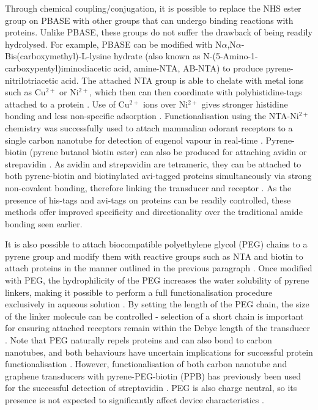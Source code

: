 \documentclass[
  a4paper,
]{scrbook}
\begin{document}
Through chemical coupling/conjugation, it is possible to replace the NHS
ester group on PBASE with other groups that can undergo binding
reactions with proteins. Unlike PBASE, these groups do not suffer the
drawback of being readily hydrolysed. For example, PBASE can be modified
with N\(\alpha\),N\(\alpha\)-Bis(carboxymethyl)-L-lysine hydrate (also
known as N-(5-Amino-1-carboxypentyl)iminodiacetic acid, amine-NTA,
AB-NTA) to produce pyrene-nitrilotriacetic acid. The attached NTA group
is able to chelate with metal ions such as Cu\(^{2+}\) or Ni\(^{2+}\),
which then can then coordinate with polyhistidine-tags attached to a
protein \autocite{Holzinger2011,Fruh2011,Amano2016,Chang2017}. Use of
Cu\(^{2+}\) ions over Ni\(^{2+}\) gives stronger histidine bonding and
less non-specific adsorption \autocite{Chang2017}. Functionalisation
using the NTA-Ni\(^{2+}\) chemistry was successfully used to attach
mammalian odorant receptors to a single carbon nanotube for detection of
eugenol vapour in real-time \autocite{Goldsmith2011}. Pyrene-biotin
(pyrene butanol biotin ester) can also be produced for attaching avidin
or strepavidin \autocite{Holzinger2011}. As avidin and strepavidin are
tetrameric, they can be attached to both pyrene-biotin and biotinylated
avi-tagged proteins simultaneously via strong non-covalent bonding,
therefore linking the transducer and receptor
\autocite{Star2003a,Dundas2013,Hermanson2013-11,Fairhead2015}. As the
presence of his-tags and avi-tags on proteins can be readily controlled,
these methods offer improved specificity and directionality over the
traditional amide bonding seen earlier.

It is also possible to attach biocompatible \autocite{Chen2004}
polyethylene glycol (PEG) chains to a pyrene group and modify them with
reactive groups such as NTA and biotin to attach proteins in the manner
outlined in the previous paragraph
\autocite{Hermanson2013-18,Meran2018}. Once modified with PEG, the
hydrophilicity of the PEG increases the water solubility of pyrene
linkers, making it possible to perform a full functionalisation
procedure exclusively in aqueous solution
\autocite{Chen2004,Hermanson2013-18}. By setting the length of the PEG
chain, the size of the linker molecule can be controlled - selection of
a short chain is important for ensuring attached receptors remain within
the Debye length of the transducer \autocite{Shkodra2021}. Note that PEG
naturally repels proteins and can also bond to carbon nanotubes, and
both behaviours have uncertain implications for successful protein
functionalisation \autocite{Chen2004}. However, functionalisation of
both carbon nanotube and graphene transducers with pyrene-PEG-biotin
(PPB) has previously been used for the successful detection of
streptavidin \autocite{Star2003a,Miki2019}. PEG is also charge neutral,
so its presence is not expected to significantly affect device
characteristics \autocite{Chen2004}.
\end{document}
